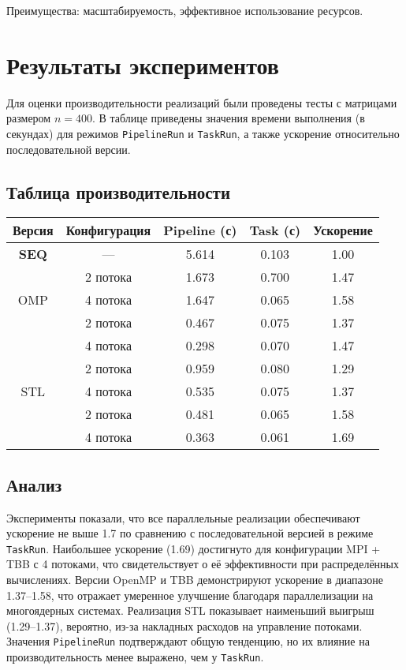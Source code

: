 \documentclass[12pt]{article}
\begin{document}
Преимущества: масштабируемость, эффективное использование ресурсов.

\section{Результаты экспериментов}

\hspace*{1.25em}Для оценки производительности реализаций были проведены тесты с матрицами размером $n=400$. В таблице приведены значения времени выполнения (в секундах) для режимов \texttt{PipelineRun} и \texttt{TaskRun}, а также ускорение относительно последовательной версии.

\subsection{Таблица производительности}

\renewcommand{\arraystretch}{1.4}
\begin{table}[H]
\centering
\footnotesize
\begin{tabular}{|c|c|c|c|c|}
\hline
\textbf{Версия} & \textbf{Конфигурация} & \textbf{Pipeline (с)} & \textbf{Task (с)} & \textbf{Ускорение} \\
\hline
\textbf{SEQ} & — & 5.614 & 0.103 & 1.00 \\
\hline
\multirow{3}{*}{OMP} 
  & 2 потока & 1.673 & 0.700 & 1.47 \\
  & 4 потока & 1.647 & 0.065 & 1.58 \\
\hline
\multirow{3}{*}{TBB} 
  & 2 потока & 0.467 & 0.075 & 1.37 \\
  & 4 потока & 0.298 & 0.070 & 1.47 \\
\hline
\multirow{3}{*}{STL} 
  & 2 потока & 0.959 & 0.080 & 1.29 \\
  & 4 потока & 0.535 & 0.075 & 1.37 \\
\hline
\multirow{3}{*}{MPI + TBB} 
  & 2 потока & 0.481 & 0.065 & 1.58 \\
  & 4 потока & 0.363 & 0.061 & 1.69 \\
\hline
\end{tabular}
\label{tab:fox_perf}
\end{table}

\subsection*{Анализ}

\hspace*{1.25em}Эксперименты показали, что все параллельные реализации обеспечивают ускорение не выше 1.7 по сравнению с последовательной версией в режиме \texttt{TaskRun}. Наибольшее ускорение (1.69) достигнуто для конфигурации MPI + TBB с 4 потоками, что свидетельствует о её эффективности при распределённых вычислениях. Версии OpenMP и TBB демонстрируют ускорение в диапазоне 1.37–1.58, что отражает умеренное улучшение благодаря параллелизации на многоядерных системах. Реализация STL показывает наименьший выигрыш (1.29–1.37), вероятно, из-за накладных расходов на управление потоками. Значения \texttt{PipelineRun} подтверждают общую тенденцию, но их влияние на производительность менее выражено, чем у \texttt{TaskRun}.
\end{document}
